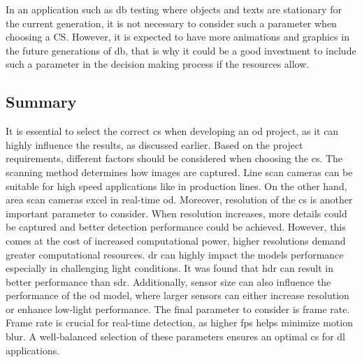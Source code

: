 In an application such as \gls{db} testing where objects and texts are stationary for the current generation, it is not necessary to consider such a parameter when choosing a CS. However, it is expected to have more animations and graphics in the future generations of \gls{db}, that is why it could be a good investment to include such a parameter in the decision making process if the resources allow.

\subsection{Summary}
It is essential to select the correct \gls{cs} when developing an \gls{od} project, as it can highly influence the results, as discussed earlier. Based on the project requirements, different factors should be considered when choosing the \gls{cs}. The scanning method determines how images are captured. Line scan cameras can be suitable for high speed applications like in production lines. On the other hand, area scan cameras excel in real-time \gls{od}. Moreover, resolution of the \gls{cs} is another important parameter to consider. When resolution increases, more details could be captured and better detection performance could be achieved. However, this comes at the cost of increased computational power, higher resolutions demand greater computational resources. \gls{dr} can highly impact the models performance especially in challenging light conditions. It was found that \gls{hdr} can result in better performance than \gls{sdr}. Additionally, sensor size can also influence the performance of the \gls{od} model, where larger sensors can either increase resolution or enhance low-light performance. The final parameter to consider is frame rate. Frame rate is crucial for real-time detection, as higher \gls{fps} helps minimize motion blur. A well-balanced selection of these parameters ensures an optimal \gls{cs} for \gls{dl} applications.



